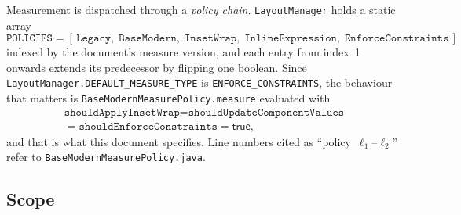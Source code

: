 \documentclass[11pt,a4paper]{article}
\newcommand{\jv}[1]{\texttt{#1}}       %
\theoremstyle{definition}
\theoremstyle{plain}
\theoremstyle{remark}
\begin{document}
Measurement is dispatched through a \emph{policy chain}. \jv{LayoutManager}
holds a static array
\[
  \jv{POLICIES} = [\,
    \jv{Legacy},\;
    \jv{BaseModern},\;
    \jv{InsetWrap},\;
    \jv{InlineExpression},\;
    \jv{EnforceConstraints}\,]
\]
indexed by the document's measure version, and each entry from index~1 onwards
extends its predecessor by flipping one boolean. Since
\jv{LayoutManager.DEFAULT\_MEASURE\_TYPE} is \jv{ENFORCE\_CONSTRAINTS}, the
behaviour that matters is \jv{BaseModernMeasurePolicy.measure} evaluated with
\[
  \begin{gathered}
    \jv{shouldApplyInsetWrap} = \jv{shouldUpdateComponentValues} \\
    = \jv{shouldEnforceConstraints} = \textsf{true},
  \end{gathered}
\]
and that is what this document specifies. Line numbers cited as
``policy~$\ell_1$--$\ell_2$'' refer to \jv{BaseModernMeasurePolicy.java}.

\subsection{Scope}
\end{document}
